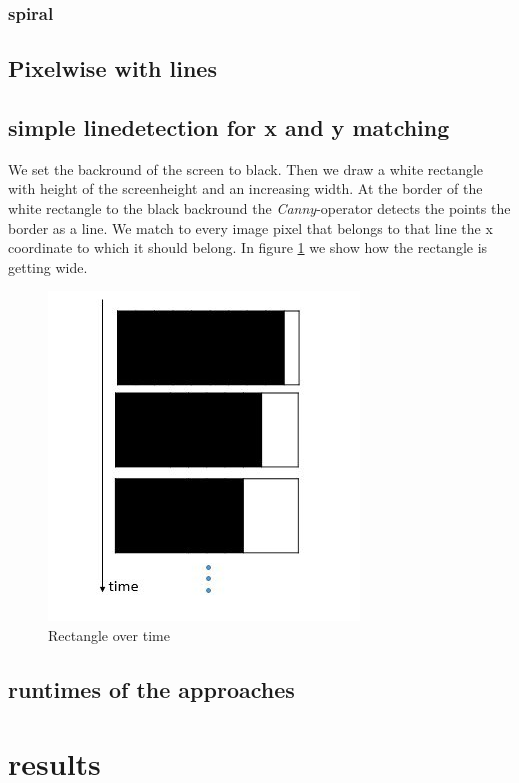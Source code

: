 \documentclass[journal,final,a4paper,twoside]{PS}
\begin{document}
\subsubsection{spiral}
\subsection{Pixelwise with lines}
\subsection{simple linedetection for x and y matching}
We set the backround of the screen to black. Then we draw a white rectangle with height of the screenheight and an increasing width. At the border of the white rectangle to the black backround the \emph{Canny}-operator detects the points the border as a line. We match to every image pixel that belongs to that line the x coordinate to which it should belong. In figure \ref{fig:blockOverTime} we show how the rectangle is getting wide.
\\

\begin{figure}[h]
\begin{center}
\includegraphics[scale=0.8]{./pics/blockOverTime.jpg}
\caption{Rectangle over time}
\label{fig:blockOverTime}
\end{center}
\end{figure}

\subsection{runtimes of the approaches}



\section{results}
\label{sec:results}
\end{document}
